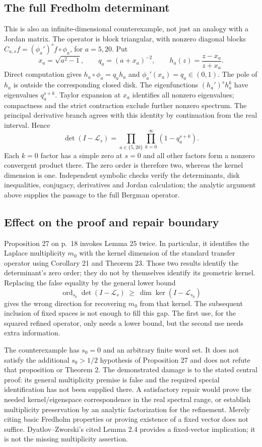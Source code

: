 \documentclass[10pt]{article}
\begin{document}
\subsection*{The full Fredholm determinant}
This is also an infinite-dimensional counterexample, not just an analogy with a Jordan matrix. The operator is block triangular, with nonzero diagonal blocks \(C_{a,s}f=(\phi_a')^s f\circ\phi_a\), for \(a=5,20\). Put \[x_a=\sqrt{a^2-1},\qquad q_a=(a+x_a)^{-2},\qquad
 h_a(z)=\frac{z-x_a}{z+x_a}.\] Direct computation gives \(h_a\circ\phi_a=q_a h_a\) and \(\phi_a'(x_a)=q_a\in(0,1)\). The pole of \(h_a\) is outside the corresponding closed disk. The eigenfunctions \((h_a')^s h_a^k\) have eigenvalues \(q_a^{s+k}\). Taylor expansion at \(x_a\) identifies all nonzero eigenvalues; compactness and the strict contraction exclude further nonzero spectrum. The principal derivative branch agrees with this identity by continuation from the real interval. Hence \[\det(I-\mathcal L_s)
   =\prod_{a\in\{5,20\}}\prod_{k=0}^\infty(1-q_a^{s+k}).\] Each \(k=0\) factor has a simple zero at \(s=0\) and all other factors form a nonzero convergent product there. The zero order is therefore two, whereas the kernel dimension is one. Independent symbolic checks verify the determinants, disk inequalities, conjugacy, derivatives and Jordan calculation; the analytic argument above supplies the passage to the full Bergman operator.\par
\subsection*{Effect on the proof and repair boundary}
Proposition 27 on p. 18 invokes Lemma 25 twice. In particular, it identifies the Laplace multiplicity \(m_0\) with the kernel dimension of the standard transfer operator using Corollary 21 and Theorem 23. Those two results identify the determinant’s zero order; they do not by themselves identify its geometric kernel. Replacing the false equality by the general lower bound \[\operatorname{ord}_{s_0}\det(I-\mathcal L_s)
       \ \ge\ \dim\ker(I-\mathcal L_{s_0})\] gives the wrong direction for recovering \(m_0\) from that kernel. The subsequent inclusion of fixed spaces is not enough to fill this gap. The first use, for the squared refined operator, only needs a lower bound, but the second use needs extra information.\par
The counterexample has \(s_0=0\) and an arbitrary finite word set. It does not satisfy the additional \(s_0>1/2\) hypothesis of Proposition 27 and does not refute that proposition or Theorem 2. The demonstrated damage is to the stated central proof: its general multiplicity premise is false and the required special identification has not been supplied there. A satisfactory repair would prove the needed kernel/eigenspace correspondence in the real spectral range, or establish multiplicity preservation by an analytic factorization for the refinement. Merely citing basic Fredholm properties or proving existence of a fixed vector does not suffice. Dyatlov–Zworski’s cited Lemma 2.4 provides a fixed-vector implication; it is not the missing multiplicity assertion.\par
\end{document}

